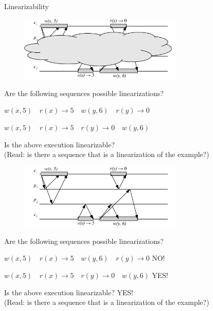 \begin{frame}{Linearizability}

\begin{overprint}
\begin{figure}
\includegraphics[width=0.7\textwidth]{figs/09/lin-02}
\end{figure}

\begin{example}
\BI
\item Are the following sequences possible linearizations?
\BI
\item $w(x,5) \quad r(x) \rightarrow 5 \quad w(y,6) \quad r(y) \rightarrow 0$
\item $w(x,5) \quad r(x) \rightarrow 5 \quad r(y) \rightarrow 0 \quad w(y,6)$
\EI
\item Is the above execution linearizable?\\ (Read: is there a sequence that is a linearization of the example?)
\EI
\end{example}

\begin{figure}
\includegraphics[width=0.7\textwidth]{figs/09/lin-02n}
\end{figure}

\begin{example}
\BI
\item Are the following sequences possible linearizations?
\BI
\item $w(x,5) \quad r(x) \rightarrow 5 \quad w(y,6) \quad r(y) \rightarrow 0$ \qquad NO!
\item $w(x,5) \quad r(x) \rightarrow 5 \quad r(y) \rightarrow 0 \quad w(y,6)$ \qquad YES!
\EI
\item Is the above execution linearizable? \qquad YES!\\ (Read: is there a sequence that is a linearization of the example?)
\EI

\end{example}

\end{overprint}

\end{frame}

